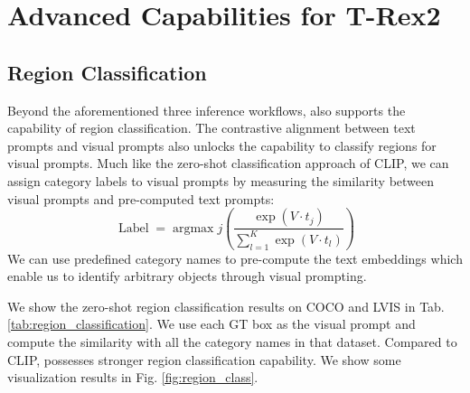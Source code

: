 \section{Advanced Capabilities for T-Rex2}
\subsection{Region Classification}
\label{sec:Region}
Beyond the aforementioned three inference workflows, \ourmodel{} also supports the capability of region classification. The contrastive alignment between text prompts and visual prompts also unlocks the capability to classify regions for visual prompts. Much like the zero-shot classification approach of CLIP, we can assign category labels to visual prompts by measuring the similarity between visual prompts and pre-computed text prompts:
\begin{equation}
\operatorname{Label} = \operatorname{argmax}j \left(\frac{\exp(V \cdot t_j)}{\sum_{l=1}^K \exp(V \cdot t_l)}\right)
\end{equation}
We can use predefined category names to pre-compute the text embeddings which enable us to identify arbitrary objects through visual prompting. 

We show the zero-shot region classification results on COCO and LVIS in Tab. \ref{tab:region_classification}. We use each GT box as the visual prompt and compute the similarity with all the category names in that dataset. Compared to CLIP, \ourmodel{} possesses stronger region classification capability. We show some visualization results in Fig. \ref{fig:region_class}.


